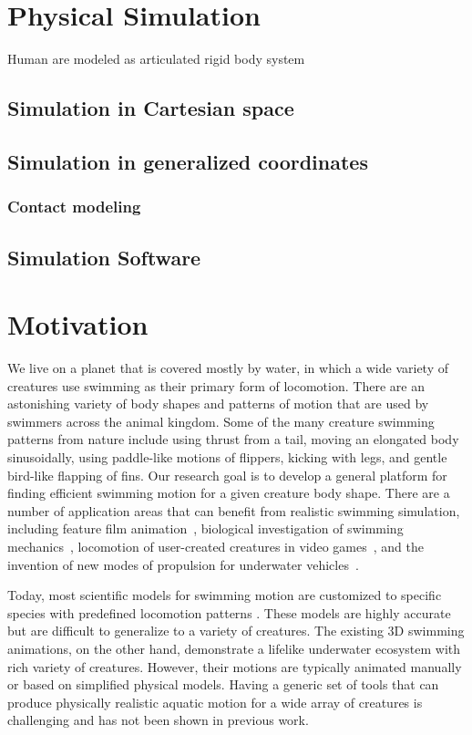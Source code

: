 \section{Physical Simulation}
Human are modeled as articulated rigid body system
\subsection{Simulation in Cartesian space}
\subsection{Simulation in generalized coordinates} %
\subsubsection{Contact modeling}
\subsection{Simulation Software}


\section{Motivation}

We live on a planet that is covered mostly by water, in which a wide variety of
creatures use swimming as their primary form of locomotion.  There are
an astonishing variety of body shapes and patterns of motion that are used
by swimmers across the animal kingdom.  Some of the many creature swimming
patterns from nature include using thrust from a tail, moving an elongated
body sinusoidally, using paddle-like motions of flippers, kicking with legs,
and gentle bird-like flapping of fins.  Our research goal is to develop a
general platform for finding efficient swimming motion for a given creature
body shape.  There are a number of application areas that can benefit from
realistic swimming simulation, including feature film
animation~\cite{stanton2003finding}, biological investigation of swimming
mechanics~\cite{kern2006simulations,shirgaonkar2008hydrodynamics},
locomotion of user-created creatures in video games~\cite{hecker2008real},
and the invention of new modes of propulsion for underwater
vehicles~\cite{barrett2002optimal}.

Today, most scientific models for swimming motion are customized to specific
species with predefined locomotion patterns
\cite{shirgaonkar2008hydrodynamics}. These models are
highly accurate but are difficult to generalize to a variety of creatures.
The existing 3D swimming animations, on the other hand, demonstrate a
lifelike underwater ecosystem with rich variety of creatures. However, their motions are typically animated
manually or based on simplified physical models. Having a generic set of
tools that can produce physically realistic aquatic motion for a wide array
of creatures is challenging and has not been shown in previous work.

